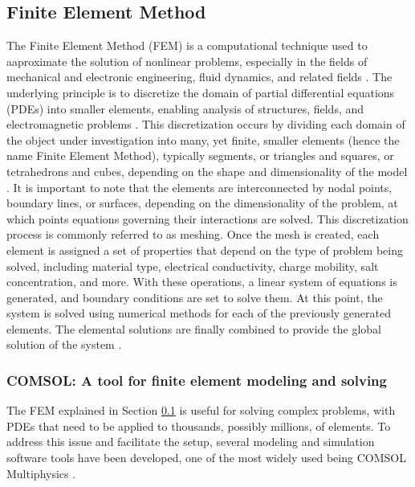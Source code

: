 \subsection{Finite Element Method}
\label{sec:FEM}
The Finite Element Method (FEM) is a computational technique used to aaproximate the solution of nonlinear problems, especially in the fields of mechanical and electronic engineering, fluid dynamics, and related fields \citep{zienkiewiczFinite2013}. The underlying principle is to discretize the domain of partial differential equations (PDEs) into smaller elements, enabling analysis of structures, fields, and electromagnetic problems \citep{loggAutomating2007}. This discretization occurs by dividing each domain of the object under investigation into many, yet finite, smaller elements (hence the name Finite Element Method), typically segments, or triangles and squares, or tetrahedrons and cubes, depending on the shape and dimensionality of the model \citep{comsolCOMSOL_manual}. It is important to note that the elements are interconnected by nodal points, boundary lines, or surfaces, depending on the dimensionality of the problem, at which points equations governing their interactions are solved. This discretization process is commonly referred to as meshing. Once the mesh is created, each element is assigned a set of properties that depend on the type of problem being solved, including material type, electrical conductivity, charge mobility, salt concentration, and more. With these operations, a linear system of equations is generated, and boundary conditions are set to solve them. At this point, the system is solved using numerical methods for each of the previously generated elements. The elemental solutions are finally combined to provide the global solution of the system \citep{zienkiewiczFinite2013}.

\subsubsection{COMSOL: A tool for finite element modeling and solving}
The FEM explained in Section \ref{sec:FEM} is useful for solving complex problems, with PDEs that need to be applied to thousands, possibly millions, of elements. To address this issue and facilitate the setup, several modeling and simulation software tools have been developed, one of the most widely used being COMSOL Multiphysics \citep{comsolCOMSOL_manual}.

